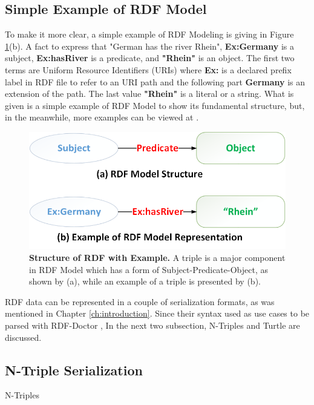 \subsection{Simple Example of RDF Model}

To make it more clear, a simple example of RDF Modeling is giving in Figure \ref{Fig:rdfModel}(b). A fact to express that "German has the river Rhein", \textbf{Ex:Germany} is a subject, \textbf{Ex:hasRiver} is a predicate, and \textbf{"Rhein"} is an object. The first two terms are Uniform Resource Identifiers (URIs) where \textbf{Ex:} is a declared prefix label in RDF file to refer to an URI path and the following part \textbf{Germany} is an extension of the path. The last value \textbf{"Rhein"} is a literal or a string. What is given is a simple example of RDF Model to show its fundamental structure, but, in the meanwhile, more examples can be viewed at \cite{W3C:RDF-Primer:Online}.

\begin{figure}[ht]
	\begin{center}
		\includegraphics[scale=0.4,angle=0]{images/RDF-Model}
		\setlength\belowcaptionskip{-5mm}
		\caption{\textbf{ Structure of RDF with Example.} A triple is a major component in RDF Model which has a form of Subject-Predicate-Object, as shown by (a), while an example of a triple is presented by (b).}
		\label{Fig:rdfModel}
	\end{center}
\end{figure}
RDF data can be represented in a couple of serialization formats, as was mentioned in Chapter \ref{ch:introduction}. Since their syntax used as use cases to be parsed with RDF-Doctor , In the next two subsection, N-Triples and Turtle are discussed. 
\subsection{N-Triple Serialization}
N-Triples \cite{W3C:Ntriples:Online}

